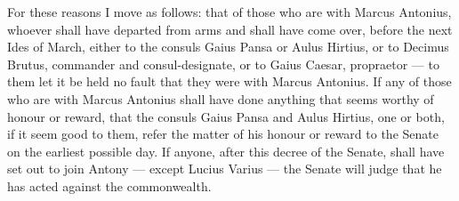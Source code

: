  For these reasons I move as follows: that of those who are with Marcus Antonius, whoever shall have departed from arms and shall have come over, before the next Ides of March, either to the consuls Gaius Pansa or Aulus Hirtius, or to Decimus Brutus, commander and consul-designate, or to Gaius Caesar, propraetor --- to them let it be held no fault that they were with Marcus Antonius. If any of those who are with Marcus Antonius shall have done anything that seems worthy of honour or reward, that the consuls Gaius Pansa and Aulus Hirtius, one or both, if it seem good to them, refer the matter of his honour or reward to the Senate on the earliest possible day. If anyone, after this decree of the Senate, shall have set out to join Antony --- except Lucius Varius --- the Senate will judge that he has acted against the commonwealth.
